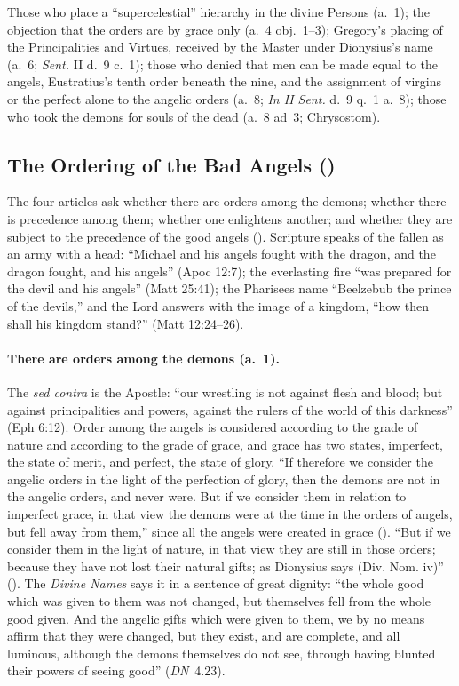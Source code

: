  {Those who place a ``supercelestial'' hierarchy in the divine Persons (a.~1);
 the objection that the orders are by grace only (a.~4 obj.~1--3); Gregory's
 placing of the Principalities and Virtues, received by the Master under
 Dionysius's name (a.~6; \emph{Sent.} II d.~9 c.~1); those who denied that
 men can be made equal to the angels, Eustratius's tenth order beneath the
 nine, and the assignment of virgins or the perfect alone to the angelic
 orders (a.~8; \emph{In II Sent.} d.~9 q.~1 a.~8); those who took the
 demons for souls of the dead (a.~8 ad~3; Chrysostom).}

\subsection{The Ordering of the Bad Angels ()}\label{sec:q109}

The four articles ask whether there are orders among the demons; whether
there is precedence among them; whether one enlightens another; and whether
they are subject to the precedence of the good angels ().
Scripture speaks of the fallen as an army with a head: ``Michael and his
angels fought with the dragon, and the dragon fought, and his angels'' (Apoc
12:7); the everlasting fire ``was prepared for the devil and his angels''
(Matt 25:41); the Pharisees name ``Beelzebub the prince of the devils,'' and
the Lord answers with the image of a kingdom, ``how then shall his kingdom
stand?'' (Matt 12:24--26).

\paragraph{There are orders among the demons (a.~1).} The \emph{sed contra}
is the Apostle: ``our wrestling is not against flesh and blood; but against
principalities and powers, against the rulers of the world of this darkness''
(Eph 6:12). Order among the angels is considered according to the grade of
nature and according to the grade of grace, and grace has two states,
imperfect, the state of merit, and perfect, the state of glory. ``If
therefore we consider the angelic orders in the light of the perfection of
glory, then the demons are not in the angelic orders, and never were. But if
we consider them in relation to imperfect grace, in that view the demons were
at the time in the orders of angels, but fell away from them,'' since all the
angels were created in grace (). ``But if we consider them
in the light of nature, in that view they are still in those orders; because
they have not lost their natural gifts; as Dionysius says (Div. Nom. iv)''
(). The \emph{Divine Names} says it in a sentence of
great dignity: ``the whole good which was given to them was not changed, but
themselves fell from the whole good given. And the angelic gifts which were
given to them, we by no means affirm that they were changed, but they exist,
and are complete, and all luminous, although the demons themselves do not
see, through having blunted their powers of seeing good'' (\emph{DN}~4.23).

